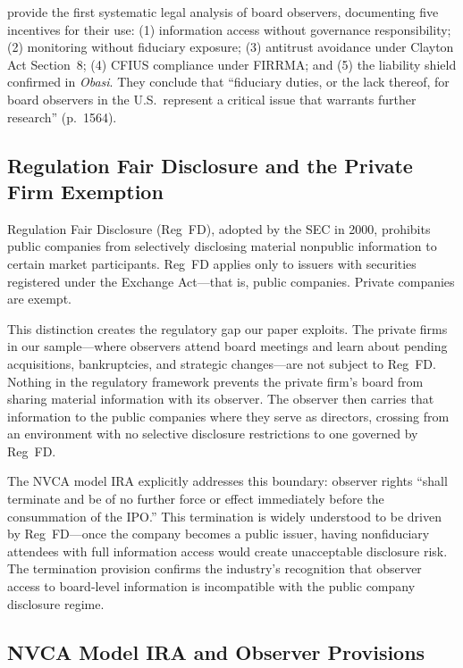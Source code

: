 \citet{packin2025board} provide the first systematic legal analysis of board observers, documenting five incentives for their use: (1) information access without governance responsibility; (2) monitoring without fiduciary exposure; (3) antitrust avoidance under Clayton Act Section~8; (4) CFIUS compliance under FIRRMA; and (5) the liability shield confirmed in \textit{Obasi}. They conclude that ``fiduciary duties, or the lack thereof, for board observers in the U.S.\ represent a critical issue that warrants further research'' (p.~1564).

\subsection{Regulation Fair Disclosure and the Private Firm Exemption}

Regulation Fair Disclosure (Reg~FD), adopted by the SEC in 2000, prohibits public companies from selectively disclosing material nonpublic information to certain market participants. Reg~FD applies only to issuers with securities registered under the Exchange Act---that is, public companies. Private companies are exempt.

This distinction creates the regulatory gap our paper exploits. The private firms in our sample---where observers attend board meetings and learn about pending acquisitions, bankruptcies, and strategic changes---are not subject to Reg~FD. Nothing in the regulatory framework prevents the private firm's board from sharing material information with its observer. The observer then carries that information to the public companies where they serve as directors, crossing from an environment with no selective disclosure restrictions to one governed by Reg~FD.

The NVCA model IRA explicitly addresses this boundary: observer rights ``shall terminate and be of no further force or effect immediately before the consummation of the IPO.'' This termination is widely understood to be driven by Reg~FD---once the company becomes a public issuer, having nonfiduciary attendees with full information access would create unacceptable disclosure risk. The termination provision confirms the industry's recognition that observer access to board-level information is incompatible with the public company disclosure regime.

\subsection{NVCA Model IRA and Observer Provisions}

